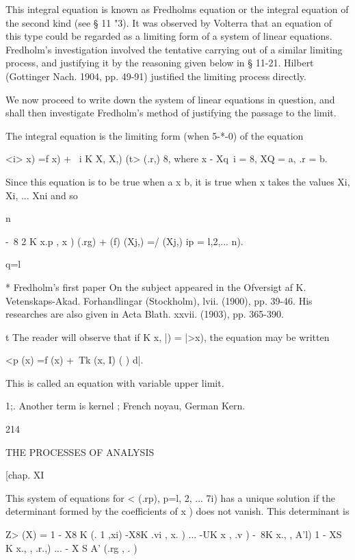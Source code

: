 This integral equation is known as Fredholms equation or the integral
equation of the second kind (see § 11 "3). It was observed by Volterra
that an equation of this type could be regarded as a limiting form of
a system of linear equations. Fredholm's investigation involved the
tentative carrying out of a similar limiting process, and justifying
it by the reasoning given below in § 11-21. Hilbert (Gottinger Nach.
1904, pp. 49-91) justified the limiting process directly.

We now proceed to write down the system of linear equations in
question, and shall then investigate Fredholm's method of justifying
the passage to the limit.

The integral equation is the limiting form (when 5-*-0) of the
equation

<i> x) =f x) + \ i K X, X,) (t> (.r,) 8, where x - Xq\ i = 8, XQ = a,
.r = b.

Since this equation is to be true when a x b, it is true when x takes
the values Xi, Xi, ... Xni and so

n

-\ 8 2 K x.p , x ) (.rg) + (f) (Xj,) =/ (Xj,) ip = l,2,... n).

q=l

* Fredholm's first paper On the subject appeared in the Ofversigt af
K. Vetenskaps-Akad. Forhandlingar (Stockholm), lvii. (1900), pp.
39-46. His researches are also given in Acta Blath. xxvii. (1903), pp.
365-390.

t The reader will observe that if K x, |) = |>x), the equation may be
written

<p (x) =f (x) +\ Tk (x, I) ( ) d|.



This is called an equation with variable upper limit.

1;. Another term is kernel ; French noyau, German Kern.



214



THE PROCESSES OF ANALYSIS



[chap. XI



This system of equations for < (.rp), p=l, 2, ... 7i) has a unique
solution if the determinant formed by the coefficients of x ) does not
vanish. This determinant is

Z> (X) = 1 - X8 K (. 1 ,xi) -X8K .vi , x. ) ... -UK x , .v ) -\ 8K x.,
, A'l) 1 - XS K x., , .r.,) ... - X S A' (.rg , . )



